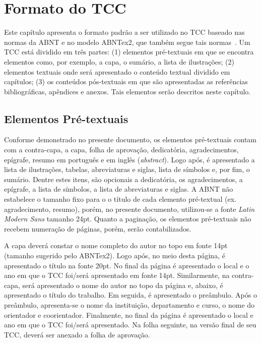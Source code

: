 \chapter[Formato do TCC]{Formato do TCC}
\label{cap:formatoTCC}

Este capítulo apresenta o formato padrão a ser utilizado no TCC baseado nas normas da ABNT e no modelo ABNTex2, que também segue tais normas~\cite{abntTxtAcad2011,abntex2modelo}. Um TCC está dividido em três partes:  (1) elementos pré-textuais em que se encontra elementos como, por exemplo, a capa, o sumário, a lista de ilustrações; (2)  elementos textuais onde será apresentado o conteúdo textual dividido em capítulos;  (3) os conteúdos pós-textuais  em que são apresentadas as referências bibliográficas, apêndices e anexos. Tais elementos serão descritos neste capítulo.


\section{Elementos Pré-textuais}
\label{sec:preTextual}

Conforme demonstrado no presente documento, os elementos pré-textuais contam com a contra-capa, a capa, folha de aprovação, dedicatória, agradecimentos, epígrafe, resumo em português e em inglês (\textit{abstract}). Logo após, é apresentado a lista de ilustrações, tabelas, abreviaturas e siglas, lista de símbolos e, por fim, o sumário.
Dentre estes itens, são opcionais a dedicatória, os agradecimentos,  a epígrafe,  a lista de símbolos, a lista de abreviaturas e siglas. A ABNT não estabelece o tamanho fixo para o o título de cada  elemento pré-textual (ex. agradecimento, resumo), porém, no presente documento,  utilizou-se a fonte \textit{Latin Modern Sans} tamanho 24pt. Quanto a paginação, os elementos pré-textuais não recebem numeração de páginas, porém, serão contabilizados.


A capa deverá constar o nome completo do autor no topo em fonte 14pt (tamanho sugerido pelo ABNTex2). Logo após, no meio desta página, é apresentado o título na fonte 20pt. No final da página é apresentado o  local e o ano em que o TCC foi/será apresentado em fonte 14pt. Similarmente, na contra-capa, será apresentado o nome do autor no topo da página e,  abaixo, é apresentado o título do trabalho. Em seguida,  é apresentado o preâmbulo. 
Após o preâmbulo, apresenta-se o nome da instituição, departamento e curso, o nome do orientador e coorientador. Finalmente, no final da página é apresentado o local  e ano em que o TCC foi/será apresentado. Na folha seguinte, na versão final de seu TCC, deverá ser anexado a folha de aprovação.


